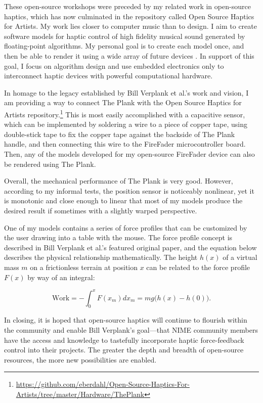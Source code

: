 These open-source workshops were preceded by my related work in open-source haptics, which has now culminated in the repository called Open Source Haptics for Artists. My work lies closer to computer music than to design. I aim to create software models for haptic control of high fidelity musical sound generated by floating-point algorithms. My personal goal is to create each model once, and then be able to render it using a wide array of future devices \cite{Hertz:2012}. In support of this goal, I focus on algorithm design and use embedded electronics only to interconnect haptic devices with powerful computational hardware.

In homage to the legacy established by Bill Verplank et al.'s work and vision, I am providing a way to connect The Plank with the Open Source Haptics for Artists repository.\footnote{\url{https://github.com/eberdahl/Open-Source-Haptics-For-Artists/tree/master/Hardware/ThePlank}} This is most easily accomplished with a capacitive sensor, which can be implemented by soldering a wire to a piece of copper tape, using double-stick tape to fix the copper tape against the backside of The Plank handle, and then connecting this wire to the FireFader microcontroller board. Then, any of the models developed for my open-source FireFader device can also be rendered using The Plank.

Overall, the mechanical performance of The Plank is very good. However, according to my informal tests, the position sensor is noticeably nonlinear, yet it is monotonic and close enough to linear that most of my models produce the desired result if sometimes with a slightly warped perspective.

One of my models contains a series of force profiles that can be customized by the user drawing into a table with the mouse. The force profile concept is described in Bill Verplank et al.'s featured original paper, and the equation below describes the physical relationship mathematically. The height $h(x)$ of a virtual mass $m$ on a frictionless terrain at position $x$ can be related to the force profile $F(x)$ by way of an integral:

\begin{equation}
\mathrm{Work} = -\int_0^x F(x_m)dx_m = mg\Big(h(x)-h(0)\Big).
\end{equation}

In closing, it is hoped that open-source haptics will continue to flourish within the community and enable Bill Verplank's goal---that NIME community members have the access and knowledge to tastefully incorporate haptic force-feedback control into their projects.  The greater the depth and breadth of open-source resources, the more new possibilities are enabled.
